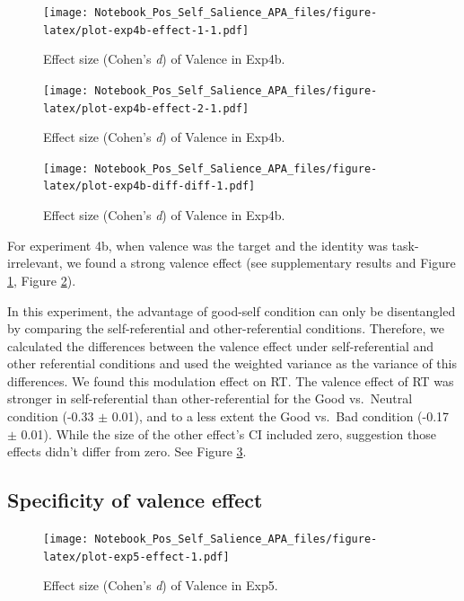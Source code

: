 \documentclass[
  english,
  man]{apa6}
\begin{document}
\begin{figure}
\centering
\texttt{[image: Notebook\_Pos\_Self\_Salience\_APA\_files/figure-latex/plot-exp4b-effect-1-1.pdf]}
\caption{\label{fig:plot-exp4b-effect-1}Effect size (Cohen's \emph{d}) of Valence in Exp4b.}
\end{figure}

\begin{figure}
\centering
\texttt{[image: Notebook\_Pos\_Self\_Salience\_APA\_files/figure-latex/plot-exp4b-effect-2-1.pdf]}
\caption{\label{fig:plot-exp4b-effect-2}Effect size (Cohen's \emph{d}) of Valence in Exp4b.}
\end{figure}

\begin{figure}
\centering
\texttt{[image: Notebook\_Pos\_Self\_Salience\_APA\_files/figure-latex/plot-exp4b-diff-diff-1.pdf]}
\caption{\label{fig:plot-exp4b-diff-diff}Effect size (Cohen's \emph{d}) of Valence in Exp4b.}
\end{figure}

For experiment 4b, when valence was the target and the identity was task-irrelevant, we found a strong valence effect (see supplementary results and Figure \ref{fig:plot-exp4b-effect-1}, Figure \ref{fig:plot-exp4b-effect-2}).

In this experiment, the advantage of good-self condition can only be disentangled by comparing the self-referential and other-referential conditions. Therefore, we calculated the differences between the valence effect under self-referential and other referential conditions and used the weighted variance as the variance of this differences. We found this modulation effect on RT. The valence effect of RT was stronger in self-referential than other-referential for the Good vs.~Neutral condition (-0.33 \(\pm\) 0.01), and to a less extent the Good vs.~Bad condition (-0.17 \(\pm\) 0.01). While the size of the other effect's CI included zero, suggestion those effects didn't differ from zero. See Figure \ref{fig:plot-exp4b-diff-diff}.

\hypertarget{specificity-of-valence-effect}{%
\subsection{Specificity of valence effect}\label{specificity-of-valence-effect}}

\begin{figure}
\centering
\texttt{[image: Notebook\_Pos\_Self\_Salience\_APA\_files/figure-latex/plot-exp5-effect-1.pdf]}
\caption{\label{fig:plot-exp5-effect}Effect size (Cohen's \emph{d}) of Valence in Exp5.}
\end{figure}
\end{document}
